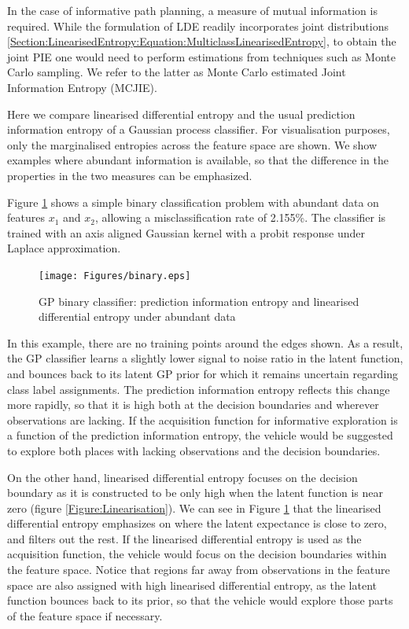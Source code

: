 			In the case of informative path planning, a measure of mutual information is required. While the formulation of LDE readily incorporates joint distributions \eqref{Section:LinearisedEntropy:Equation:MulticlassLinearisedEntropy}, to obtain the joint PIE one would need to perform estimations from techniques such as Monte Carlo sampling. We refer to the latter as Monte Carlo estimated Joint Information Entropy (MCJIE).
			
			Here we compare linearised differential entropy and the usual prediction information entropy of a Gaussian process classifier. For visualisation purposes, only the marginalised entropies across the feature space are shown. We show examples where abundant information is available, so that the difference in the properties in the two measures can be emphasized. 
			
			Figure \ref{Figure:Results:BinaryLinearisedEntropy} shows a simple binary classification problem with abundant data on features $x_{1}$ and $x_{2}$, allowing a misclassification rate of 2.155\%. The classifier is trained with an axis aligned Gaussian kernel with a probit response under Laplace approximation. 
	
			\begin{figure}[t]
			\centering
				\texttt{[image: Figures/binary.eps]}
			\caption{GP binary classifier: prediction information entropy and linearised differential entropy under abundant data}
			\label{Figure:Results:BinaryLinearisedEntropy}
			\end{figure}
			
			In this example, there are no training points around the edges shown. As a result, the GP classifier learns a slightly lower signal to noise ratio in the latent function, and bounces back to its latent GP prior for which it remains uncertain regarding class label assignments. The prediction information entropy reflects this change more rapidly, so that it is high both at the decision boundaries and wherever observations are lacking. If the acquisition function for informative exploration is a function of the prediction information entropy, the vehicle would be suggested to explore both places with lacking observations and the decision boundaries. 
			
			On the other hand, linearised differential entropy focuses on the decision boundary as it is constructed to be only high when the latent function is near zero (figure \ref{Figure:Linearisation}). We can see in Figure \ref{Figure:Results:BinaryLinearisedEntropy} that the linearised differential entropy emphasizes on where the latent expectance is close to zero, and filters out the rest. If the linearised differential entropy is used as the acquisition function, the vehicle would focus on the decision boundaries within the feature space. Notice that regions far away from observations in the feature space are also assigned with high linearised differential entropy, as the latent function bounces back to its prior, so that the vehicle would explore those parts of the feature space if necessary.
			

